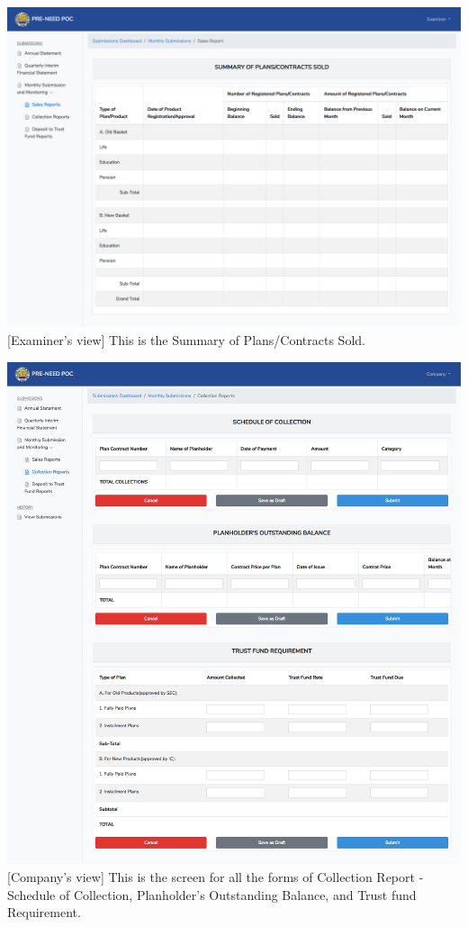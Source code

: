 \documentclass{article}
\begin{document}
\includegraphics[keepaspectratio=true]{up-ic-screens/image48}{}[Examiner’s view] This is the Summary of Plans/Contracts
Sold.%

\includegraphics[keepaspectratio=true]{up-ic-screens/image128}{}[Company’s view] This is the screen for all the forms of
Collection Report - Schedule of Collection, Planholder’s Outstanding
Balance, and Trust fund Requirement.%
\end{document}
